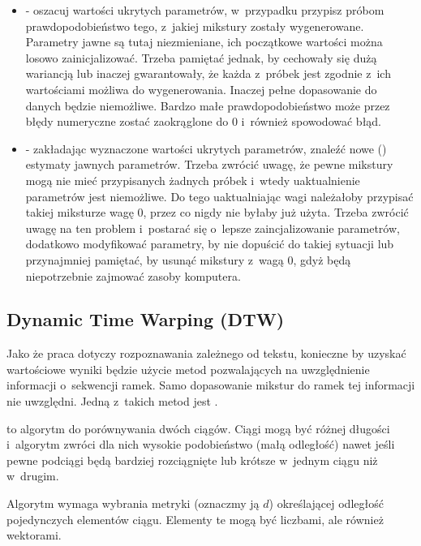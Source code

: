 \begin{itemize}
    \item {} - oszacuj wartości ukrytych parametrów, w~przypadku  przypisz próbom
        prawdopodobieństwo tego, z~jakiej mikstury zostały wygenerowane. Parametry jawne są tutaj niezmieniane,
        ich początkowe wartości można losowo zainicjalizować. Trzeba pamiętać jednak, by cechowały się dużą wariancją
        lub inaczej gwarantowały, że każda z~próbek jest zgodnie z~ich wartościami możliwa do wygenerowania. Inaczej
        pełne dopasowanie do danych będzie niemożliwe. Bardzo małe prawdopodobieństwo może przez błędy numeryczne
        zostać zaokrąglone do $0$ i~również spowodować błąd.
    \item {} - zakładając wyznaczone wartości ukrytych parametrów, znaleźć nowe 
        () estymaty
        jawnych parametrów. Trzeba zwrócić uwagę, że pewne mikstury mogą nie mieć przypisanych żadnych próbek
        i~wtedy uaktualnienie parametrów jest niemożliwe. Do tego uaktualniając wagi  należałoby
        przypisać takiej miksturze wagę $0$, przez co nigdy nie byłaby już użyta. Trzeba zwrócić uwagę na ten problem
        i~postarać się o~lepsze zaincjalizowanie parametrów, dodatkowo modyfikować parametry, by nie dopuścić
        do takiej sytuacji lub przynajmniej pamiętać, by usunąć mikstury z~wagą $0$, gdyż będą niepotrzebnie zajmować
        zasoby komputera.
\end{itemize}

\subsection{Dynamic Time Warping (DTW)\cite{ADynamicProgrammingApproach}}\label{sec:dtw}

Jako że praca dotyczy rozpoznawania zależnego od tekstu, konieczne by uzyskać wartościowe wyniki będzie
użycie metod pozwalających na uwzględnienie informacji o~sekwencji ramek. Samo dopasowanie mikstur do ramek
tej informacji nie uwzględni. Jedną z~takich metod jest .

 to algorytm do porównywania dwóch ciągów. Ciągi mogą być różnej długości i~algorytm zwróci
dla nich wysokie podobieństwo (małą odległość) nawet jeśli pewne podciągi będą bardziej rozciągnięte lub krótsze
w~jednym ciągu niż w~drugim.

Algorytm wymaga wybrania metryki (oznaczmy ją $d$) określającej odległość pojedynczych elementów ciągu.
Elementy te mogą być liczbami, ale również wektorami.

